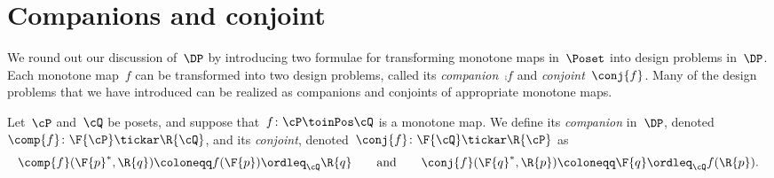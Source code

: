 \section{Companions and conjoint}
We round out our discussion of~$\DP$ by introducing two formulae for transforming monotone maps in~$\Poset$ into design problems in~$\DP$. Each monotone map~$f$ can be transformed into two design problems, called its \emph{companion}~$\comp{f}$ and \emph{conjoint}~$\conj{f}$. Many of the design problems that we have introduced can be realized as companions and conjoints of appropriate monotone maps.

\begin{definition}
\label{def:comp_conj}
Let~$\cP $ and~$\cQ $ be posets, and suppose that~$f\colon\cP \toinPos \cQ $ is a monotone map. We define its \emph{companion} in~$\DP$, denoted~$\comp{f}\colon \F{\cP} \tickar \R{\cQ}$,
and its \emph{conjoint}, denoted~$\conj{f}\colon \F{\cQ} \tickar \R{\cP}$ as
\begin{equation}
\comp{f}(\F{p}^*,\R{q})\coloneqq f(\F{p}) \ordleq_\cQ \R{q}
\qquad\text{and}\qquad
\conj{f}(\F{q}^*,\R{p})\coloneqq \F{q} \ordleq_\cQ f(\R{p}).
\end{equation}
\end{definition}

